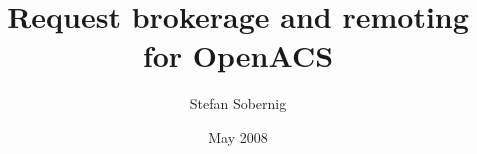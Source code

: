 
  
\title{Request brokerage and remoting for OpenACS}
\author{Stefan Sobernig}
\date{May 2008}
\maketitle
\renewcommand{\contentsname}{}
\tableofcontents 









 \newpage
 
 \newpage
    
